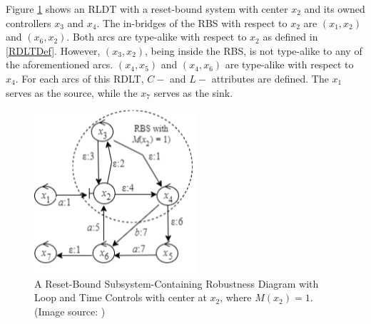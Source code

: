 Figure \ref{sampleRDLT} shows an RLDT with a reset-bound system with center $x_2$ and its owned controllers $x_3$ and $x_4$. The in-bridges of the RBS with respect to $x_2$ are $(x_1, x_2)$ and $(x_6,x_2)$. Both arcs are type-alike with respect to $x_2$ as defined in \ref{RDLTDef}. However, $(x_3,x_2)$, being inside the RBS, is not type-alike to any of the aforementioned arcs. $(x_4, x_5)$ and $(x_4, x_6)$ are type-alike with respect to $x_4$.
For each arcs of this RDLT, $C-$ and $L-$ attributes are defined. The $x_1$ serves as the source, while the $x_7$ serves as the sink. 
\begin{figure} [H]
    \centering
    \includegraphics[width=6cm]{../Figures/sampleRDLT.png}
    \caption{A Reset-Bound Subsystem-Containing Robustness Diagram with Loop and Time Controls with center at $x_2$, where $M(x_2)=1$. (Image source: \cite{MalinaoWCTP2023})}
    \label{sampleRDLT}
 \end{figure}

